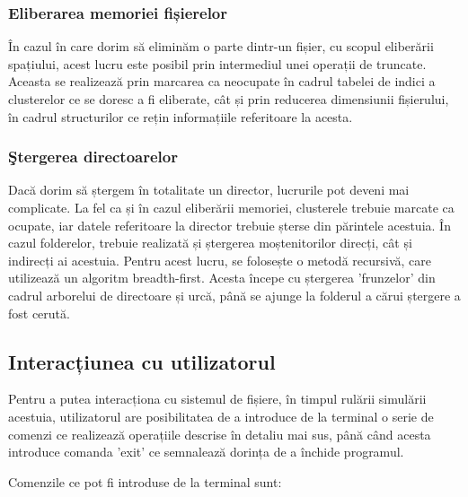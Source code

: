 \subsubsection{Eliberarea memoriei fișierelor}

În cazul în care dorim să eliminăm o parte dintr-un fișier, cu scopul eliberării spațiului, acest lucru este posibil prin intermediul unei operații de truncate. Aceasta se realizează prin marcarea ca neocupate în cadrul tabelei de indici a clusterelor ce se doresc a fi eliberate, cât și prin reducerea dimensiunii fișierului, în cadrul structurilor ce rețin informațiile referitoare la acesta.

\subsubsection{Ştergerea directoarelor}

Dacă dorim să ștergem în totalitate un director, lucrurile pot deveni mai complicate. La fel ca și în cazul eliberării memoriei, clusterele trebuie marcate ca ocupate, iar datele referitoare la director trebuie șterse din părintele acestuia. În cazul folderelor, trebuie realizată și ștergerea moștenitorilor direcți, cât și indirecți ai acestuia. Pentru acest lucru, se folosește o metodă recursivă, care utilizează un algoritm breadth-first. Acesta începe cu ștergerea 'frunzelor' din cadrul arborelui de directoare și urcă, până se ajunge la folderul a cărui ștergere a fost cerută.


\subsection{Interacțiunea cu utilizatorul}

Pentru a putea interacționa cu sistemul de fișiere, în timpul rulării simulării acestuia, utilizatorul are posibilitatea de a introduce de la terminal o serie de comenzi ce realizează operațiile descrise în detaliu mai sus, până când acesta introduce comanda 'exit' ce semnalează dorința de a închide programul.

Comenzile ce pot fi introduse de la terminal sunt:

